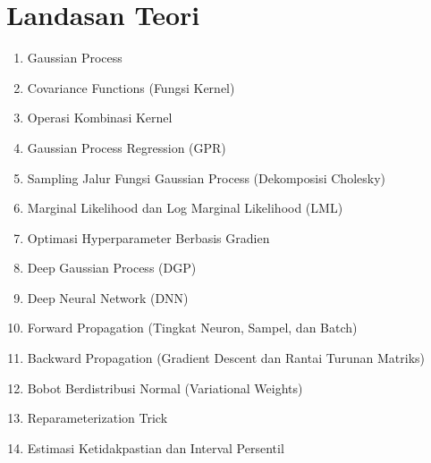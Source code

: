 \chapter{Landasan Teori}
\label{chap:landasan_teori}

\begin{enumerate}
    \item Gaussian Process
    \item Covariance Functions (Fungsi Kernel)
    \item Operasi Kombinasi Kernel
    \item Gaussian Process Regression (GPR)
    \item Sampling Jalur Fungsi Gaussian Process (Dekomposisi Cholesky)
    \item Marginal Likelihood dan Log Marginal Likelihood (LML)
    \item Optimasi Hyperparameter Berbasis Gradien
    \item Deep Gaussian Process (DGP)
    \item Deep Neural Network (DNN)
    \item Forward Propagation (Tingkat Neuron, Sampel, dan Batch)
    \item Backward Propagation (Gradient Descent dan Rantai Turunan Matriks)
    \item Bobot Berdistribusi Normal (Variational Weights)
    \item Reparameterization Trick
    \item Estimasi Ketidakpastian dan Interval Persentil
\end{enumerate}
